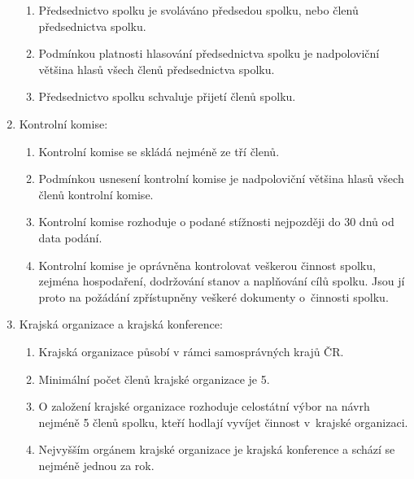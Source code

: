 \documentclass[a4paper]{article}
\begin{document}
\begin{enumerate}
\begin{enumerate}
        \item Předsednictvo spolku je svoláváno předsedou spolku, nebo
             členů předsednictva spolku.

        \item Podmínkou platnosti hlasování předsednictva spolku je
            nadpoloviční většina hlasů všech členů předsednictva spolku.

        \item Předsednictvo spolku schvaluje přijetí členů spolku.

        \end{enumerate}

    \item Kontrolní komise:
        \begin{enumerate}
        \item Kontrolní komise se skládá nejméně ze tří členů.

        \item Podmínkou usnesení kontrolní komise je nadpoloviční většina
            hlasů všech členů kontrolní komise.

        \item Kontrolní komise rozhoduje o podané stížnosti nejpozději do
            30 dnů od data podání.

        \item Kontrolní komise je oprávněna kontrolovat veškerou činnost
            spolku, zejména hospodaření, dodržování stanov a naplňování cílů
            spolku. Jsou jí proto na požádání zpřístupněny veškeré dokumenty
            o~činnosti spolku.
        \end{enumerate}

    \item Krajská organizace a krajská konference:
        \begin{enumerate}
        \item Krajská organizace působí v rámci samosprávných krajů ČR.

        \item Minimální počet členů krajské organizace je 5.

        \item O založení krajské organizace rozhoduje celostátní výbor
            na návrh nejméně 5 členů spolku, kteří hodlají vyvíjet činnost
            v~krajské organizaci.

        \item Nejvyšším orgánem krajské organizace je krajská konference a
            schází se nejméně jednou za rok.


\end{enumerate}
\end{enumerate}
\end{document}
